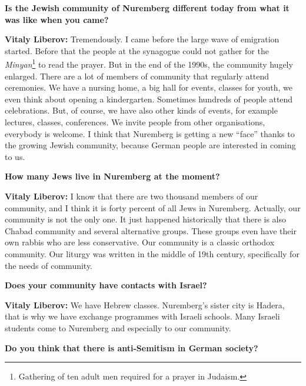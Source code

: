 \textbf{Is the Jewish community of Nuremberg different today from what it was like when you came?} 

\textbf{Vitaly Liberov:} Tremendously. I came before the large wave of emigration started. Before that the people at the synagogue could not gather for the \textit{Minyan}\footnote{Gathering of ten adult men required for a prayer in Judaism.} to read the prayer. But in the end of the 1990s, the community hugely enlarged. There are a lot of members of community that regularly attend ceremonies. We have a nursing home, a big hall for events, classes for youth, we even think about opening a kindergarten. Sometimes hundreds of people attend celebrations.  But, of course, we have also other kinds of events, for example lectures, classes, conferences. We invite people from other organisations, everybody is welcome. I think that Nuremberg is getting a new ``face'' thanks to the growing Jewish community, because German people are interested in coming to us.    

\textbf{How many Jews live in Nuremberg at the moment?} 

\textbf{Vitaly Liberov:} I know that there are two thousand members of our community, and I think it is forty percent of all Jews in Nuremberg. Actually, our community is not the only one. It just happened historically that there is also Chabad community and several alternative groups. These groups even have their own rabbis who are less conservative. Our community is a classic orthodox community. 
Our liturgy was written in the middle of 19th century, specifically for the needs of community.   

\textbf{Does your community have contacts with Israel?} 

\textbf{Vitaly Liberov:} We have Hebrew classes. Nuremberg’s sister city is Hadera, that is why we have exchange programmes with Israeli schools. Many Israeli students come to Nuremberg and especially to our community. 

\textbf{Do you think that there is anti-Semitism in German society?} 

